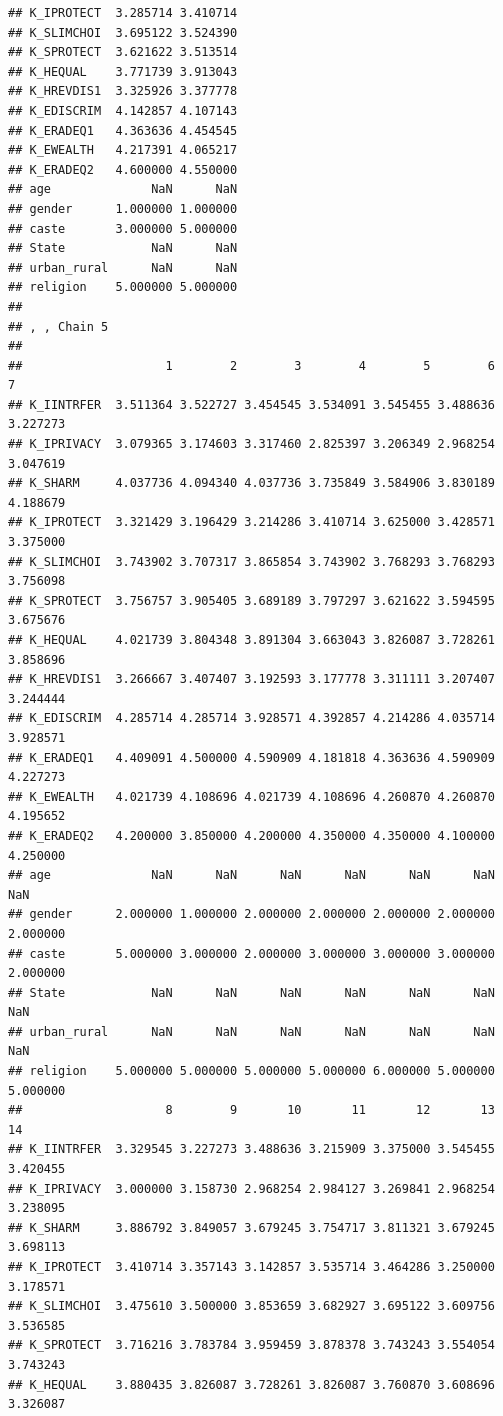 \documentclass[
]{article}
\begin{document}
\begin{verbatim}
## K_IPROTECT  3.285714 3.410714
## K_SLIMCHOI  3.695122 3.524390
## K_SPROTECT  3.621622 3.513514
## K_HEQUAL    3.771739 3.913043
## K_HREVDIS1  3.325926 3.377778
## K_EDISCRIM  4.142857 4.107143
## K_ERADEQ1   4.363636 4.454545
## K_EWEALTH   4.217391 4.065217
## K_ERADEQ2   4.600000 4.550000
## age              NaN      NaN
## gender      1.000000 1.000000
## caste       3.000000 5.000000
## State            NaN      NaN
## urban_rural      NaN      NaN
## religion    5.000000 5.000000
## 
## , , Chain 5
## 
##                    1        2        3        4        5        6        7
## K_IINTRFER  3.511364 3.522727 3.454545 3.534091 3.545455 3.488636 3.227273
## K_IPRIVACY  3.079365 3.174603 3.317460 2.825397 3.206349 2.968254 3.047619
## K_SHARM     4.037736 4.094340 4.037736 3.735849 3.584906 3.830189 4.188679
## K_IPROTECT  3.321429 3.196429 3.214286 3.410714 3.625000 3.428571 3.375000
## K_SLIMCHOI  3.743902 3.707317 3.865854 3.743902 3.768293 3.768293 3.756098
## K_SPROTECT  3.756757 3.905405 3.689189 3.797297 3.621622 3.594595 3.675676
## K_HEQUAL    4.021739 3.804348 3.891304 3.663043 3.826087 3.728261 3.858696
## K_HREVDIS1  3.266667 3.407407 3.192593 3.177778 3.311111 3.207407 3.244444
## K_EDISCRIM  4.285714 4.285714 3.928571 4.392857 4.214286 4.035714 3.928571
## K_ERADEQ1   4.409091 4.500000 4.590909 4.181818 4.363636 4.590909 4.227273
## K_EWEALTH   4.021739 4.108696 4.021739 4.108696 4.260870 4.260870 4.195652
## K_ERADEQ2   4.200000 3.850000 4.200000 4.350000 4.350000 4.100000 4.250000
## age              NaN      NaN      NaN      NaN      NaN      NaN      NaN
## gender      2.000000 1.000000 2.000000 2.000000 2.000000 2.000000 2.000000
## caste       5.000000 3.000000 2.000000 3.000000 3.000000 3.000000 2.000000
## State            NaN      NaN      NaN      NaN      NaN      NaN      NaN
## urban_rural      NaN      NaN      NaN      NaN      NaN      NaN      NaN
## religion    5.000000 5.000000 5.000000 5.000000 6.000000 5.000000 5.000000
##                    8        9       10       11       12       13       14
## K_IINTRFER  3.329545 3.227273 3.488636 3.215909 3.375000 3.545455 3.420455
## K_IPRIVACY  3.000000 3.158730 2.968254 2.984127 3.269841 2.968254 3.238095
## K_SHARM     3.886792 3.849057 3.679245 3.754717 3.811321 3.679245 3.698113
## K_IPROTECT  3.410714 3.357143 3.142857 3.535714 3.464286 3.250000 3.178571
## K_SLIMCHOI  3.475610 3.500000 3.853659 3.682927 3.695122 3.609756 3.536585
## K_SPROTECT  3.716216 3.783784 3.959459 3.878378 3.743243 3.554054 3.743243
## K_HEQUAL    3.880435 3.826087 3.728261 3.826087 3.760870 3.608696 3.326087

\end{verbatim}
\end{document}
